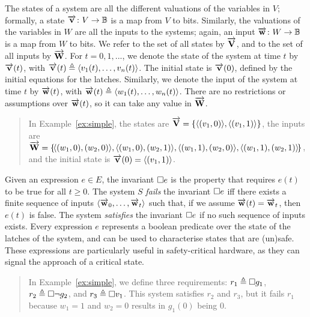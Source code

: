 {The states of a system are all the different valuations of the variables in $V$; 
formally, a state $\overrightarrow{\bf{v}} \colon V \rightarrow \mathbb{B}$ is a map from $V$ to bits. Similarly, the 
valuations of the variables in $W$ are all the inputs to the systems; 
again, an input $\overrightarrow{\bf{w}}\colon W \rightarrow \mathbb{B}$ is a map from $W$ to bits. We refer to the set of all states by $\vect{V}%
$, and to the set of all inputs by $\vect{W}%
$.
For  $t=0,1,...$, we denote the state of the system at time $t$ by $\overrightarrow{\bf{v}}(t)$, with 
$\overrightarrow{\bf{v}}(t)\triangleq {{\left<v_1(t), \ldots, v_n(t)\right>}}$. %
The initial state is $\overrightarrow{\bf{v}}(0)$, defined by the initial equations for the latches. Similarly, we denote the input of the system at time $t$ by $\overrightarrow{\bf{w}}(t)$, with $\overrightarrow{\bf{w}}(t)\triangleq{{\left<w_1(t), \ldots, w_n(t)\right>}}$. There are no restrictions or assumptions over $\overrightarrow{\bf{w}}(t)$, so it can take any value in $\overrightarrow{\bf{W}}$.
\begin{quote}
In Example~\ref{ex:simple}, the states are $\overrightarrow{\bf{V}}=\left\{{{\left<(v_1,0)\right>}},{{\left<(v_1,1)\right>}}\right\}$, the inputs are $\overrightarrow{\bf{W}}=\left\{\!{{\left<(w_1,0),(w_2,0)\right>}},{{\left<(w_1,0),(w_2,1)\right>}},{{\left<(w_1,1),(w_2,0)\right>}},{{\left<(w_1,1),(w_2,1)\right>}}\!\right\}$, and the initial state is $\overrightarrow{\bf{v}}(0)={{\left<(v_1,1)\right>}}$.
\end{quote}

Given an expression $e\in E$, the invariant ${{\square}} e$ is the property that requires $e(t)$ to be true for all $t\geq 0$. The system $S$ \emph{fails} the invariant ${{\square}} e$ iff there exists a finite sequence of inputs ${{\left<\overrightarrow{\bf{w}}_0, \ldots, \overrightarrow{\bf{w}}_t\right>}}$ such that, if we assume $\overrightarrow{\bf{w}}(t)=\overrightarrow{\bf{w}}_t$, then $e(t)$ is false. The system \emph{satisfies} the invariant ${{\square}} e$ if no such sequence of inputs exists. Every expression $e$ represents a boolean predicate over the state of the latches of the system, and can be used to characterise states that are (un)safe. These expressions are particularly useful in safety-critical hardware, as they can signal the approach of a critical state.

\begin{quote}
In Example~\ref{ex:simple}, we define three requirements: $r_1\triangleq{{\square}} g_1$, $r_2 \triangleq{{\square}} \lnot g_2$, and $r_3\triangleq{{\square}} v_1$. This system satisfies $r_2$ and $r_3$, but it fails $r_1$ because $w_1=1$ and $w_2=0$ results in $g_1(0)$ being 0.
\end{quote}

}

